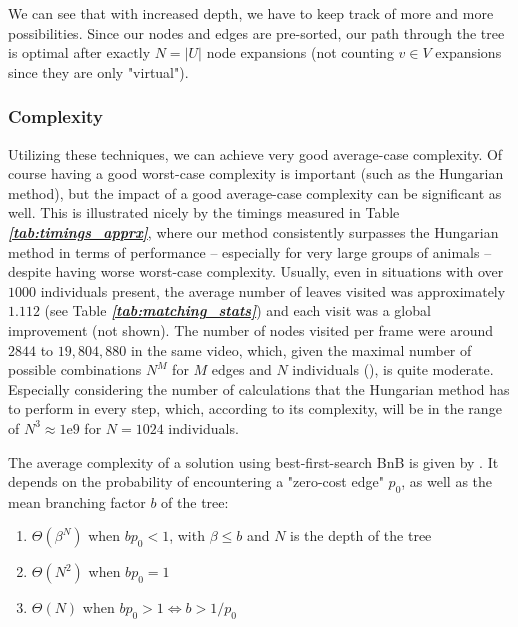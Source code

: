 \documentclass[9pt,lineno]{elife}
\newcommand{\tableref}[1]{\textit{\textbf{\ref{tab:#1}}}\xspace}
\begin{document}
\begin{appendixbox}
We can see that with increased depth, we have to keep track of more and more possibilities. Since our nodes and edges are pre-sorted, our path through the tree is optimal after exactly $N=|U|$ node expansions (not counting $v\in V$ expansions since they are only "virtual").

\subsubsection{Complexity}

Utilizing these techniques, we can achieve very good average-case complexity. Of course having a good worst-case complexity is important (such as the Hungarian method), but the impact of a good average-case complexity can be significant as well. This is illustrated nicely by the timings measured in Table \tableref{timings_apprx}, where our method consistently surpasses the Hungarian method in terms of performance -- especially for very large groups of animals -- despite having worse worst-case complexity. Usually, even in situations with over $1000$ individuals present, the average number of leaves visited was approximately $1.112$ (see Table \tableref{matching_stats}) and each visit was a global improvement (not shown). The number of nodes visited per frame were around $2844$ to $19,804,880$ in the same video, which, given the maximal number of possible combinations $N^M$ for $M$ edges and $N$ individuals (\cite{thomas2015matching}), is quite moderate. Especially considering the number of calculations that the Hungarian method has to perform in every step, which, according to its complexity, will be in the range of $N^3 \approx 1\mathrm{e}9$ for $N=1024$ individuals.

The average complexity of a solution using best-first-search BnB is given by \cite{zhang1996branch}. It depends on the probability of encountering a "zero-cost edge" $p_0$, as well as the mean branching factor $b$ of the tree:

\begin{enumerate}
    \item $\Theta(\beta^N)$ when $bp_0 < 1$, with $\beta \leq b$ and $N$ is the depth of the tree
    \item $\Theta(N^2)$ when $bp_0 = 1$
    \item $\Theta(N)$ when $bp_0 > 1 \Leftrightarrow b > 1 / p_0$
\end{enumerate}


\end{appendixbox}
\end{document}

